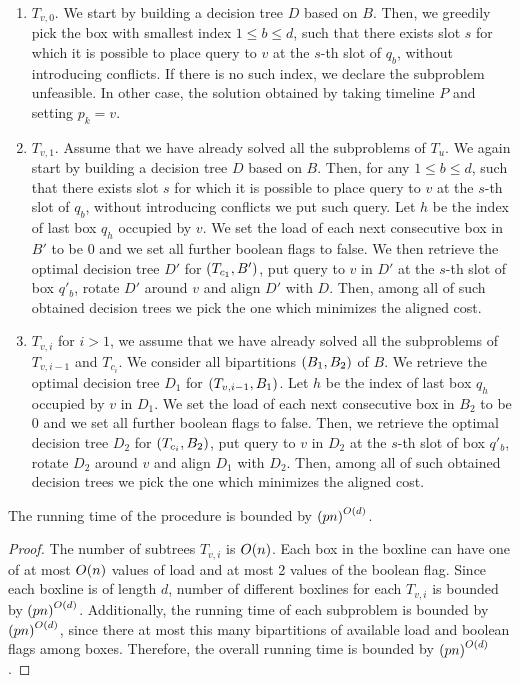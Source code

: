 

 
    \begin{enumerate}
        \item $T_{v,0}$. We start by building a decision tree $D$ based on $B$. Then, we greedily pick the box with smallest index $1 \leq b \leq d$, such that there exists slot $s$ for which it is possible to place query to $v$ at the $s$-th slot of $q_b$, without introducing conflicts. If there is no such index, we declare the subproblem unfeasible. In other case, the solution obtained by taking timeline $P$ and setting $p_k=v$.
        \item $T_{v,1}$. Assume that we have already solved all the subproblems of $T_u$. We again start by building a decision tree $D$ based on $B$. Then, for any $1 \leq b \leq d$, such that there exists slot $s$ for which it is possible to place query to $v$ at the $s$-th slot of $q_b$, without introducing conflicts we put such query. Let $h$ be the index of last box $q_h$ occupied by $v$. We set the load of each next consecutive box in $B'$ to be $0$ and we set all further boolean flags to false. We then retrieve the optimal decision tree $D'$ for $\mathopen{}\left( T_{c_1}, B' \right)$, put query to $v$ in $D'$ at the $s$-th slot of box $q'_b$, rotate $D'$ around $v$ and align $D'$ with $D$.
        Then, among all of such obtained decision trees we pick the one which minimizes the aligned cost.
        \item $T_{v,i}$ for $i>1$, we assume that we have already solved all the subproblems of $T_{v,i-1}$ and $T_{c_i}$. We consider all bipartitions $\mathopen{}\left( B_1, B_2 \right)$ of $B$. We retrieve the optimal decision tree $D_1$ for $\mathopen{}\left( T_{v, {i-1}}, B_1 \right)$. Let $h$ be the index of last box $q_h$ occupied by $v$ in $D_1$. We set the load of each next consecutive box in $B_2$ to be $0$ and we set all further boolean flags to false. Then, we retrieve the optimal decision tree $D_2$ for $\mathopen{}\left( T_{c_{i}}, B_2 \right)$, put query to $v$ in $D_2$ at the $s$-th slot of box $q'_b$, rotate $D_2$ around $v$ and align $D_1$ with $D_2$.
        Then, among all of such obtained decision trees we pick the one which minimizes the aligned cost.
    \end{enumerate}

\begin{lemma}
    The running time of the \FDPTimelinesCosts procedure is bounded by $\mathopen{}\left( pn \right)^{O\mathopen{}\left( d \right)}$.
    \begin{proof}
    The number of subtrees $T_{v,i}$ is $O\mathopen{}\left( n \right)$. Each box in the boxline can have one of at most $O\mathopen{}\left( n \right)$ values of load and at most 2 values of the boolean flag. Since each boxline is of length $d$, number of different boxlines for each $T_{v,i}$ is bounded by $\mathopen{}\left( pn \right)^{O\mathopen{}\left( d \right)}$. Additionally, the running time of each subproblem is bounded by $\mathopen{}\left( pn \right)^{O\mathopen{}\left( d \right)}$, since there at most this many bipartitions of available load and boolean flags among boxes. Therefore, the overall running time is bounded by $\mathopen{}\left( pn \right)^{O\mathopen{}\left( d \right)}$.
    \end{proof}
\end{lemma}

 








